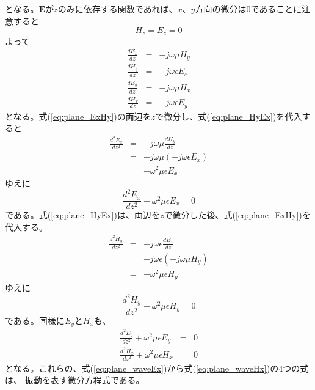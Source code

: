 となる。$\bm{E}$が$z$のみに依存する関数であれば、$x$、$y$方向の微分は$0$であることに注意すると
\begin{equation}
H_z = E_z =0
\end{equation}
よって
\begin{eqnarray}
\frac{dE_x}{dz} &=& -j\omega\mu H_y \label{eq:plane_ExHy}\\
\frac{dH_y}{dz} &=& -j\omega\epsilon E_x \label{eq:plane_HyEx}\\
\frac{dE_y}{dz} &=& -j\omega\mu H_x \label{eq:plane_EyHx}\\
\frac{dH_x}{dz} &=& -j\omega\epsilon E_y \label{eq:plane_HxEy}
\end{eqnarray}
となる。式(\ref{eq:plane_ExHy})の両辺を$z$で微分し、式(\ref{eq:plane_HyEx})を代入すると
\begin{eqnarray*}
\frac{d^2E_x}{dz^2} &=& -j\omega\mu \frac{dH_y}{dz} \nonumber\\
&=& -j\omega\mu (-j\omega\epsilon E_x) \nonumber\\
&=& -\omega^2\mu\epsilon E_x \nonumber
\end{eqnarray*}
ゆえに
\begin{equation}
\frac{d^2E_x}{dz^2} + \omega^2\mu\epsilon E_x = 0\label{eq:plane_waveEx}
\end{equation}
である。式(\ref{eq:plane_HyEx})は、両辺を$z$で微分した後、式(\ref{eq:plane_ExHy})を代入する。
\begin{eqnarray*}
\frac{d^2H_y}{dz^2} &=& -j\omega\epsilon\frac{dE_x}{dz} \nonumber \\
&=&-j\omega\epsilon(-j\omega\mu H_y) \nonumber\\
&=&-\omega^2\mu\epsilon H_y
\end{eqnarray*}
ゆえに
\begin{equation}
\frac{d^2H_y}{dz^2} + \omega^2\mu\epsilon H_y = 0\label{eq:plane_waveHy}
\end{equation}
である。同様に$E_y$と$H_x$も、
\begin{eqnarray}
\frac{d^2E_y}{dz^2} + \omega^2\mu\epsilon E_y &=& 0 \label{eq:plane_waveEy}\\
\frac{d^2H_x}{dz^2} + \omega^2\mu\epsilon H_x &=& 0\label{eq:plane_waveHx}
\end{eqnarray}
となる。これらの、式(\ref{eq:plane_waveEx})から式(\ref{eq:plane_waveHx})の4つの式は、
振動を表す微分方程式である。

